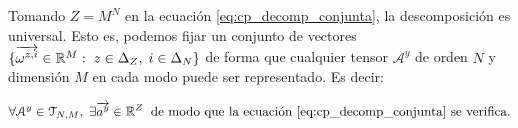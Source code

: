\begin{proposicion}  \label{prop:cp_conjunta_universal}
	Tomando $Z = M^N$ en la ecuación \eqref{eq:cp_decomp_conjunta}, la descomposición es universal. Esto es, podemos fijar un conjunto de vectores $\{ \overrightarrow{\omega^{z, i}} \in \mathbb{R}^M: \; z \in \Delta_{Z}, \; i \in \Delta_{N} \}$ de forma que cualquier tensor $\mathcal{A}^y$ de orden $N$ y dimensión $M$ en cada modo puede ser representado. Es decir:

	\begin{equation}
		\forall \mathcal{A}^y \in \mathcal{T}_{N, M}, \; \exists \overrightarrow{a^y} \in \mathbb{R}^Z \;\; \text{de modo que la ecuación \eqref{eq:cp_decomp_conjunta} se verifica.}
	\end{equation}
\end{proposicion}


